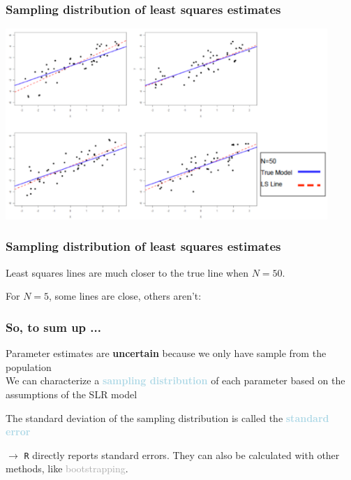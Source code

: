 \documentclass{beamer}
\newcommand{\bo}[1]{\textcolor{burntorange}{#1}}
\newcommand{\lb}[1]{\textcolor{lightblue}{#1}}
\newcommand{\dg}[1]{\textcolor{darkgray}{#1}}
\newcommand{\rd}{\color{burntorange}}
\newcommand{\bk}{\color{black}}
\newcommand{\sk}{\vspace{.5cm}}
\begin{document}
\begin{frame}
\frametitle{Sampling distribution of least squares estimates} 


\hspace*{-7mm}\includegraphics[width=4.8in]{figures/sampling2}

\end{frame}


\begin{frame}
\frametitle{Sampling distribution of least squares estimates} 


Least squares lines are much closer to the 
true line when $N=50$.

\sk
For $N=5$,
some lines are close, others aren't:
\sk
\begin{center}
 \rd {\bf We need to get ``lucky!''}\bk
\end{center}

\end{frame}

\begin{frame}
	\frametitle{So, to sum up ...}
	Parameter estimates are \bo{\bf uncertain} because we only have sample from the population \\ \sk
	We can characterize a \lb{\bf sampling distribution} of each parameter based on the assumptions of the SLR model \\ \sk
	
	  The standard deviation of the sampling distribution is called the \lb{\bf standard error} \\ \sk
	  
	  $\rightarrow$ {\tt R} directly reports standard errors.  They can also be calculated with other methods, like \dg{bootstrapping}.
\end{frame}
\end{document}
